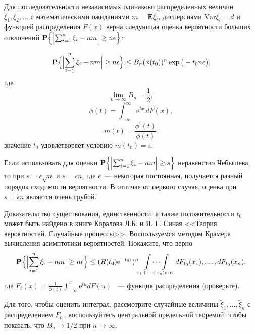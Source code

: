 \begin{problem}
Для последовательности независимых одинаково распределенных величин $\xi_1,\xi_2,\dots$ с математическими ожиданиями $m = \mathbf{E} \xi_i$, дисперсиями $\text{Var} \xi_i = d$ и функцией распределения $F(x)$ верна следующая оценка вероятности больших отклонений $\mathbf{P}\Bigl\{\Bigl|\sum_{i=1}^n\xi_i -n m \Bigr|\geq n\epsilon \Bigr\}$: 

\begin{equation*}
\mathbf{P}\Bigl\{\Bigl|\sum_{i=1}^n \xi_i -n m \Bigr|\geq n\epsilon \Bigr\} \leq B_n(\phi(t_0))^n \exp\big(-t_0 n\epsilon \bigr) ,
\end{equation*}
где 
\begin{equation*}
\lim_{n\to\infty}B_n=\frac{1}{2},
\end{equation*}
\begin{equation*}
\phi(t)=\int_{-\infty}^{\infty}\text{e}^{t x}\,d F(x),
\end{equation*}
\begin{equation*}
m(t) = \frac{\phi^{\prime}(t)}{\phi(t)}.
\end{equation*}
значение $t_0$ удовлетворяет условию  $m(t_0) = \epsilon$.
\end{problem}
\begin{remark}


Если использовать для оценки  $\mathbf{P}\Bigl\{\Bigl|\sum_{i=1}^n\xi_i - n m\Bigr|\geq s\Bigr\}$ неравенство Чебышева, то при $s = \epsilon \sqrt{n}$ и $s=\epsilon n$, где $\epsilon$~--- некоторая постоянная, получается разный порядок сходимости вероятности. В отличае от первого случая, оценка при $s=\epsilon n$ является очень грубой. 

Доказательство существования, единственности, а также положительности $t_0$  может быть найдено в книге Коралова Л.Б. и Я. Г. Синая <<Теория вероятностей. Случайные процессы>>. Воспользуемся методом Крамера вычисления асимптотики вероятностей. Покажите, что верно 
\begin{equation*}
\mathbf{P}\Bigl\{\Bigl|\sum_{i=1}^n \xi_i- n m\Bigr|\geq n \epsilon \Bigr\} \leq (R(t_0)\text{e}^{-t_0\epsilon})^n \idotsint\limits_{x_1+\dots+x_n>\epsilon n} \,dF_{t_0}(x_1),\dots,dF_{t_0}(x_n),
\end{equation*}
где $F_t(x) = \frac{1}{\phi(t)}\int_{-\infty}^{x} \text{e}^{t u}d F(u)$ ~--- функция распределения (проверьте).

Для того, чтобы оценить интеграл, рассмотрите случайные величины $\tilde{\xi}_1,\dots,\tilde{\xi}_n$ с распределением $F_{t_0}$, воспользуйтесь центральной предельной теоремой, чтобы показать, что $B_n\to1/2$ при ${n\to\infty}$.
\end{remark}


